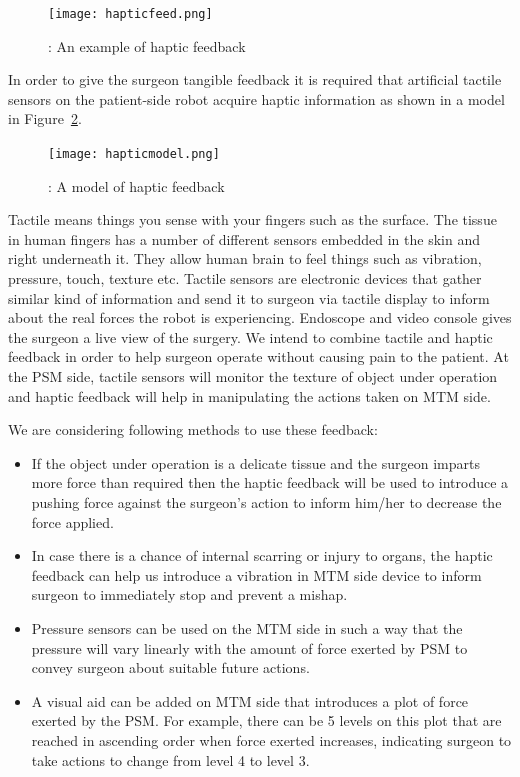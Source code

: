 \documentclass[10pt,journal,compsoc]{IEEEtran}
\begin{document}
\begin{figure}[htbp]
\begin{center}
\texttt{[image: hapticfeed.png]}
\caption{: An example of haptic feedback}
\label{fig:hapticfeed}
\end{center}
\end{figure}

In order to give the surgeon tangible feedback it is required that artificial tactile sensors on the patient-side robot acquire haptic information as shown in a model in Figure~\ref{fig:hapticmodel}. 

\begin{figure}[htbp]
\begin{center}
\texttt{[image: hapticmodel.png]}
\caption{: A model of haptic feedback}
\label{fig:hapticmodel}
\end{center}
\end{figure}

Tactile means things you sense with your fingers such as the surface. The tissue in human fingers has a number of different sensors embedded in the skin and right underneath it. They allow human brain to feel things such as vibration, pressure, touch, texture etc. Tactile sensors are electronic devices that gather similar kind of information and send it to surgeon via tactile display to inform about the real forces the robot is experiencing. Endoscope  and video console gives the surgeon a live view of the surgery. 
We intend to combine tactile and haptic feedback  in order to help surgeon operate without causing pain to the patient. At the PSM side, tactile sensors will monitor the texture of object under operation and haptic feedback will help in manipulating the actions taken on MTM side. 

We are considering following methods to use these feedback:
\begin{itemize}
\item If the object under operation is a delicate tissue and the surgeon imparts more force than required then the haptic feedback will be used to introduce a pushing force against the surgeon's action to inform him/her to decrease the force applied.
\item In case there is a chance of internal scarring or injury to organs, the haptic feedback can help us introduce a vibration in MTM side device to inform surgeon to immediately stop and prevent a mishap. 
\item Pressure sensors can be used on the MTM side in such a way that the pressure will vary linearly with the amount of force exerted by PSM to convey surgeon about suitable future actions.
\item A visual aid can be added on MTM side that introduces a plot of force exerted by the PSM.  For example, there can be 5 levels on this plot that are reached in ascending order when force exerted increases, indicating surgeon to take actions to change from level 4 to level 3.
\end{itemize}
\end{document}
